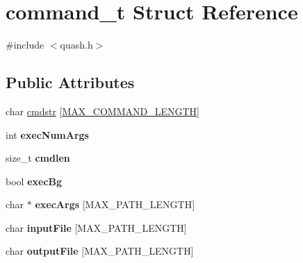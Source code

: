 \hypertarget{structcommand__t}{\section{command\-\_\-t Struct Reference}
\label{structcommand__t}
}


{\ttfamily \#include $<$quash.\-h$>$}

\subsection*{Public Attributes}
\begin{DoxyCompactItemize}
\item 
char \hyperlink{structcommand__t_a3b77457907f6e606ffafb2f1c2dbfa49}{cmdstr} \mbox{[}\hyperlink{quash_8h_af1abcb51a4aa27a5a5a7958c03448134}{M\-A\-X\-\_\-\-C\-O\-M\-M\-A\-N\-D\-\_\-\-L\-E\-N\-G\-T\-H}\mbox{]}
\item 
\hypertarget{structcommand__t_a26b2bb06f36c9fcffb0645e9cbf6772b}{int {\bfseries exec\-Num\-Args}}\label{structcommand__t_a26b2bb06f36c9fcffb0645e9cbf6772b}

\item 
\hypertarget{structcommand__t_a6728ce7c3f0c69523ac3d4c74477f8d2}{size\-\_\-t {\bfseries cmdlen}}\label{structcommand__t_a6728ce7c3f0c69523ac3d4c74477f8d2}

\item 
\hypertarget{structcommand__t_a9bcb23eafb5eddaa523a42ce2ce1b3fb}{bool {\bfseries exec\-Bg}}\label{structcommand__t_a9bcb23eafb5eddaa523a42ce2ce1b3fb}

\item 
\hypertarget{structcommand__t_a111cb34e6f363d05343c37705f215003}{char $\ast$ {\bfseries exec\-Args} \mbox{[}M\-A\-X\-\_\-\-P\-A\-T\-H\-\_\-\-L\-E\-N\-G\-T\-H\mbox{]}}\label{structcommand__t_a111cb34e6f363d05343c37705f215003}

\item 
\hypertarget{structcommand__t_aeaebfca518c584e5519f0f52dccd7a8c}{char {\bfseries input\-File} \mbox{[}M\-A\-X\-\_\-\-P\-A\-T\-H\-\_\-\-L\-E\-N\-G\-T\-H\mbox{]}}\label{structcommand__t_aeaebfca518c584e5519f0f52dccd7a8c}

\item 
\hypertarget{structcommand__t_a4dda568f97cdeb63162e75e351770f45}{char {\bfseries output\-File} \mbox{[}M\-A\-X\-\_\-\-P\-A\-T\-H\-\_\-\-L\-E\-N\-G\-T\-H\mbox{]}}\label{structcommand__t_a4dda568f97cdeb63162e75e351770f45}

\end{DoxyCompactItemize}


